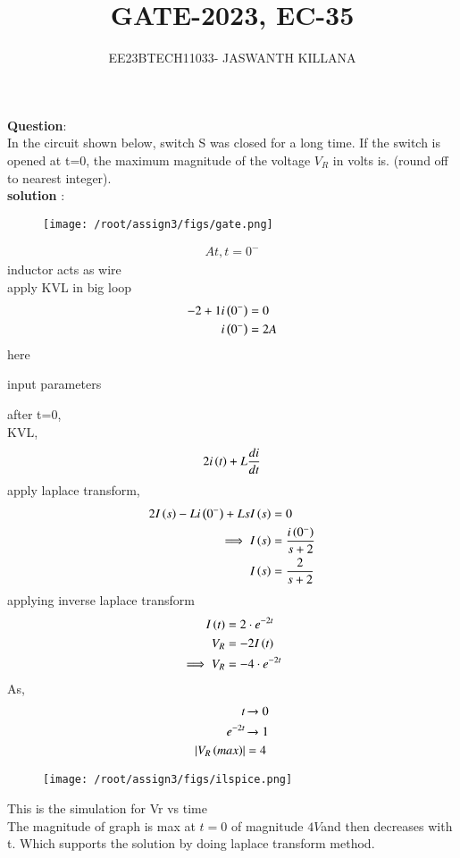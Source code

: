 \documentclass[journal,12pt,twocolumn]{IEEEtran}
\theoremstyle{remark}
\begin{document}

\vspace{3cm}

\title{GATE-2023, EC-35}
\author{EE23BTECH11033- JASWANTH KILLANA}
\maketitle
\newpage
\bigskip

\renewcommand{\thefigure}{\theenumi}
\renewcommand{\thetable}{\theenumi}
\textbf{Question}:\\
In the circuit shown below, switch S was closed for a long time. If the switch is opened at t=0, the maximum magnitude of the voltage $V_R$ in volts is. (round off to nearest integer).\\
\textbf{solution} :
\begin{figure}[th]
\centering
\texttt{[image: /root/assign3/figs/gate.png]}
\caption{}
\label{}
\end{figure}
\begin{align}
 At, t=0^-
\end{align}
inductor acts as wire\\
apply KVL in big loop
\begin{align}
-2+1i\left(0^-\right)&=0\\
i\left(0^-\right)&=2A
\end{align}
here\begin{table}[!ht]
 \centering
  
   \caption{input parameters}
   \label{GATE-2023,EC-35}
   \end{table}
after t=0,\\
KVL, \begin{align}
2i\left(t\right)+L\frac{di}{dt}
\end{align}
apply laplace transform,
 \begin{align}
2I\left(s\right)-Li\left({0^{-}}\right)+LsI\left(s\right)&=0\\
\implies I\left(s\right)&=\frac{i\left({0^{-}}\right)}{s+2}\\
I\left(s\right)&=\frac{2}{s+2}
 \end{align}
 applying inverse laplace transform
 \begin{align}
  I\left(t\right)&=2\cdot e^{-2t}\\
  V_R&=-2I\left(t\right)\\
  \implies V_R&=-4\cdot e^{-2t}
 \end{align}  
  As,
 \begin{align}
    t & \xrightarrow{} 0\\
     e^{-2t}&\xrightarrow{} 1\\
     \left\vert V_R\left(max\right)\right\vert&=4
 \end{align}
 \begin{figure}[th]
\centering
\texttt{[image: /root/assign3/figs/ilspice.png]}
\caption{}
\label{}
\end{figure}
This is the simulation for Vr vs time\\
The magnitude of graph is max at $t=0$ of magnitude $4V$and then decreases with t. Which supports the solution by doing laplace transform method.
\end{document}
